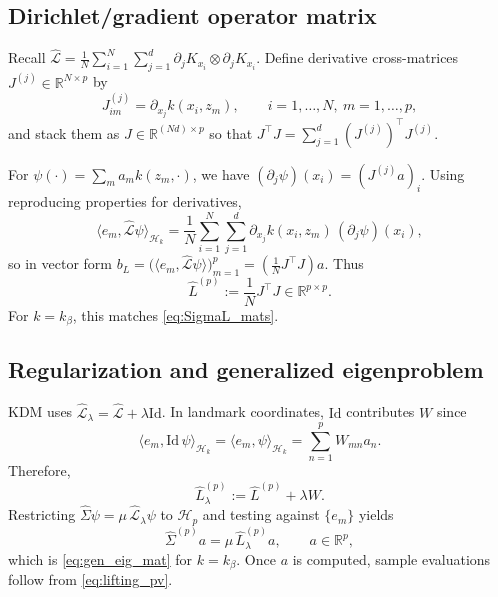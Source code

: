 \documentclass[11pt]{article}
\theoremstyle{remark}
\newcommand{\Hk}{\mathcal{H}}
\newcommand{\Id}{\mathrm{Id}}
\begin{document}
\subsection{Dirichlet/gradient operator matrix}
\label{app:L-matrix}

Recall $\widehat{\mathcal{L}}=\frac1N\sum_{i=1}^N\sum_{j=1}^d \partial_j K_{x_i}\otimes \partial_j K_{x_i}$.
Define derivative cross-matrices $J^{(j)}\in\mathbb{R}^{N\times p}$ by
\begin{equation}
J^{(j)}_{im} = \partial_{x_j} k(x_i,z_m),
\qquad i=1,\dots,N,\ m=1,\dots,p,
\label{eq:app_Jj_def}
\end{equation}
and stack them as $J\in\mathbb{R}^{(Nd)\times p}$ so that $J^\top J=\sum_{j=1}^d (J^{(j)})^\top J^{(j)}$.

For $\psi(\cdot)=\sum_m a_m k(z_m,\cdot)$, we have $(\partial_j\psi)(x_i)=(J^{(j)}a)_i$.
Using reproducing properties for derivatives,
\[
\big\langle e_m,\widehat{\mathcal{L}}\psi\big\rangle_{\Hk_k}
=
\frac1N\sum_{i=1}^N\sum_{j=1}^d
\partial_{x_j}k(x_i,z_m)\,(\partial_j\psi)(x_i),
\]
so in vector form $b_L=\big(\langle e_m,\widehat{\mathcal{L}}\psi\rangle\big)_{m=1}^p=(\frac1N J^\top J)a$.
Thus
\begin{equation}
\widehat{L}^{(p)} := \frac1N J^\top J \in\mathbb{R}^{p\times p}.
\label{eq:app_L_p}
\end{equation}
For $k=k_\beta$, this matches \eqref{eq:SigmaL_mats}.

\subsection{Regularization and generalized eigenproblem}
\label{app:gen-eig}

KDM uses $\widehat{\mathcal{L}}_\lambda=\widehat{\mathcal{L}}+\lambda\Id$.
In landmark coordinates, $\Id$ contributes $W$ since
\[
\big\langle e_m, \Id\,\psi\big\rangle_{\Hk_k}
=
\langle e_m,\psi\rangle_{\Hk_k}
=
\sum_{n=1}^p W_{mn} a_n.
\]
Therefore,
\begin{equation}
\widehat{L}^{(p)}_\lambda := \widehat{L}^{(p)} + \lambda W.
\label{eq:app_Llam_p}
\end{equation}
Restricting $\widehat{\Sigma}\psi=\mu\,\widehat{\mathcal{L}}_\lambda\psi$ to $\mathcal{H}_p$ and testing against $\{e_m\}$ yields
\begin{equation}
\widehat{\Sigma}^{(p)} a = \mu\, \widehat{L}^{(p)}_\lambda a,
\qquad a\in\mathbb{R}^p,
\label{eq:app_gen_eig_mat}
\end{equation}
which is \eqref{eq:gen_eig_mat} for $k=k_\beta$.
Once $a$ is computed, sample evaluations follow from \eqref{eq:lifting_pv}.
\end{document}
